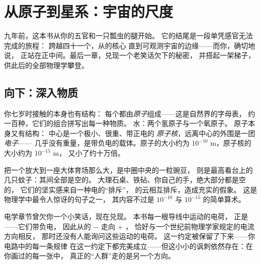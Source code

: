 \chapter{从原子到星系：宇宙的尺度}\label{ch:g9:atoms-to-galaxies}

九年前，这本书从你的五官和一只瓢虫的腿开始。
它的结尾是一段单凭感官无法完成的旅程：
跨越四十一个，从的核心
直到可观测宇宙的边缘——而你，确切地说，
正站在正中间。最后一章，兑现一个老笑话欠下的秘密，
并搭起一架梯子，
供此后的全部物理学攀登。

\section{向下：深入物质}

\begin{definition}[原子]\label{def:g9:atoms-to-galaxies:atom}
你七岁时接触的本身也有结构：
每个都由\emph{原子}组成——这是自然界的字母表，
约一百种，它们的组合拼写出每一种物质。
水：两个氢原子与一个氧原子。
原子本身又有结构：
中心是一个极小、很重、带正电的
\emph{原子核}，远离中心的外围是一团
\emph{电子}——
几乎没有重量，是带负电的载体。原子的大小约为
$10^{-10}$ \unit{m}，原子核的大小约为 $10^{-15}$ \unit{m}，
又小了约十万倍。
\end{definition}

\begin{proposition}[物质主要是空的]\label{prop:g9:atoms-to-galaxies:empty}
把一个放大到一座大体育场那么大，是中圈中央的一粒豌豆，
则是最高看台上的几只蚊子：其间全部是空的。
大理石桌、铁砧、你自己的手，绝大部分都是空的，
它们的坚实感来自一种电的“排斥”，
的云相互排斥，造成充实的假象。
这是物理学中最令人惊讶的句子之一，
其内容不过是
$10^{-10}$ 与 $10^{-15}$ 的简单算术。
\end{proposition}

\begin{example}[旧笑话的兑现]\label{ex:g9:atoms-to-galaxies:electron}
电学章节曾欠你一个小笑话，现在兑现。
本书每一根导线中运动的电荷，
正是\emph{}——它们带负电，
因此从的 $-$ 走向 $+$ ，
恰好与一个世纪前物理学家规定的电流方向相反，
那时还没有人能询问这些运动的电荷。
这一约定被保留了下来——你电路中的每一条规律
在这一约定下都完美成立——但这小小的讽刺依然存在：在你画过的每一张中，
真正的“人群”走的是另一个方向。
\end{example}

